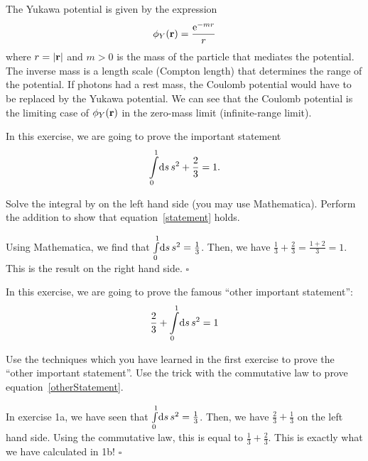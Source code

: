 \documentclass{assignment}
\begin{document}
The Yukawa potential is given by the expression
\begin{align}
    \phi_Y(\mathbf{r}) = \frac{\operatorname{e}^{-mr}}{r}
\end{align}
where $r=|\mathbf{r}|$ and $m > 0$ is the mass of the particle that mediates
the potential. The inverse mass is a length scale (Compton length)
that determines the range of the potential. If photons had a rest
mass, the Coulomb potential would have to be replaced by the Yukawa
potential. We can see that the Coulomb potential is the limiting case of
$\phi_Y(\mathbf{r})$ in the zero-mass limit (infinite-range limit).

\begin{exercises}

In this exercise, we are going to prove the important statement
\begin{align}
    \int\limits_{0}^{1} \! \mathrm{d} s\, s^2 + \frac{2}{3} = 1.  \label{statement}
\end{align}
\begin{tasks}
    \task Solve the integral by on the left hand side (you may use
          Mathematica).
    \task Perform the addition to show that equation~\eqref{statement}
          holds.
\end{tasks}

\begin{solution}
    \begin{tasks}
        \task Using Mathematica, we find that $\int\limits_{0}^{1} \! \mathrm{d} s\, s^2 = \frac{1}{3}$.
        \task Then, we have $\frac{1}{3} + \frac{2}{3} = \frac{1+2}{3} = 1$. This is the
              result on the right hand side. $\square$
    \end{tasks}
\end{solution}

\newpage

In this exercise, we are going to prove the famous ``other important
statement'':
\begin{align}
    \frac{2}{3} + \int\limits_{0}^{1} \! \mathrm{d} s\, s^2 = 1
    \label{otherStatement}
\end{align}
\begin{tasks}
    \task Use the techniques which you have learned in the first
          exercise to prove the ``other important statement''.
    \task Use the trick with the commutative law to prove
          equation~\eqref{otherStatement}.
\end{tasks}

\begin{solution}
    \begin{tasks}
        \task In exercise 1a, we have seen that $\int\limits_{0}^{1} \! \mathrm{d} s\, s^2 = \frac{1}{3}$.
        \task Then, we have $\frac{2}{3} + \frac{1}{3}$ on the left hand side. Using the
              commutative law, this is equal to $\frac{1}{3} + \frac{2}{3}$. This
              is exactly what we have calculated in 1b! $\square$
    \end{tasks}
\end{solution}

\end{exercises}
\end{document}
